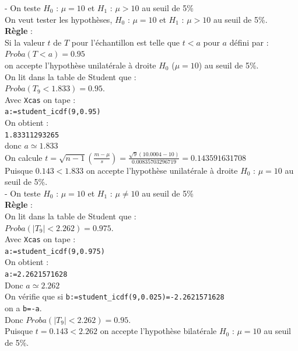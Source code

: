 \documentclass[a4paper,11pt]{book}
\begin{document}
- On teste $H_0$ : $\mu=10$ et $H_1$ : $\mu > 10$ au seuil de 5\%\\
On veut tester les hypoth\`eses,  $H_0$ : $\mu=10$ et $H_1$ :
$\mu > 10$ au seuil de 5\%.\\
{\bf R\`egle} :\\
Si la valeur $t$ de $T$ pour l'\'echantillon est telle que $t<a$ pour $a$ 
d\'efini par :\\
$Proba(T<a)=0.95$\\
 on accepte l'hypoth\`ese unilat\'erale \`a droite $H_0$ ($\mu=10$) au seuil de
 5\%.\\
On lit dans la table de Student que :\\
$Proba(T_9<1.833)=0.95$. \\
Avec {\tt Xcas} on tape :\\
{\tt a:=student\_icdf(9,0.95)}\\
On obtient :\\
{\tt 1.83311293265}\\
donc $a\simeq 1.833$\\
On calcule $\displaystyle t=\sqrt{n-1}(\frac{m-\mu}{s})=\frac{\sqrt{9}(10.0004-10)}{0.00835703296719}=0.143591631708$\\
Puisque $0.143<1.833 $ on accepte l'hypoth\`ese unilat\'erale \`a droite 
$H_0$ : $\mu=10$ au seuil de 5\%.\\

- On teste $H_0$ : $\mu=10$ et $H_1$ : $\mu \neq 10$ au seuil de 5\%\\
{\bf R\`egle} :\\
On lit dans la table de Student que :\\
$Proba(|T_9|<2.262)=0.975$. \\
Avec {\tt Xcas} on tape :\\
{\tt a:=student\_icdf(9,0.975)}\\
On obtient :\\
{\tt a:=2.2621571628}\\
Donc $a \simeq 2.262$\\
On v\'erifie que si
{\tt b:=student\_icdf(9,0.025)=-2.2621571628}\\
on a {\tt b=-a}.\\
Donc $Proba(|T_9|<2.262)=0.95$.\\
Puisque $t=0.143<2.262$ on accepte l'hypoth\`ese bilat\'erale $H_0$ : $\mu=10$ 
au seuil de 5\%.
\end{document}
